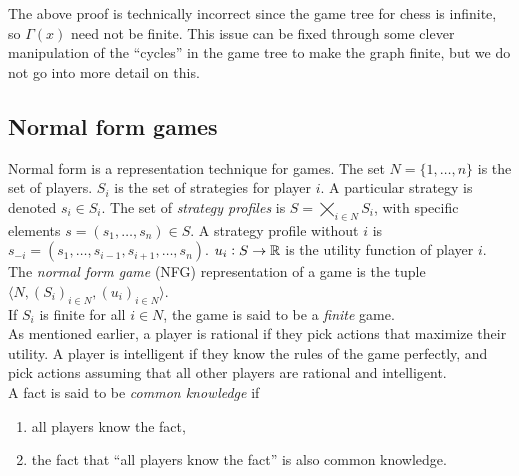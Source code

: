 	\begin{remark}
		The above proof is technically incorrect since the game tree for chess is infinite, so $\Gamma(x)$ need not be finite. This issue can be fixed through some clever manipulation of the ``cycles'' in the game tree to make the graph finite, but we do not go into more detail on this.
	\end{remark}

\subsection{Normal form games}

	Normal form is a representation technique for games. The set $N = \{1,\ldots,n\}$ is the set of players. $S_i$ is the set of strategies for player $i$. A particular strategy is denoted $s_i \in S_i$. The set of \emph{strategy profiles} is $S = \bigtimes_{i \in N} S_i$, with specific elements $s = (s_1,\ldots,s_n) \in S$. A strategy profile without $i$ is $s_{-i} = (s_1,\ldots,s_{i-1},s_{i+1},\ldots,s_n)$. $u_i : S \to \mathbb{R}$ is the utility function of player $i$.\\
	The \emph{normal form game} (NFG) representation of a game is the tuple $\langle N , (S_i)_{i \in N} , (u_i)_{i \in N} \rangle$.\\
	If $S_i$ is finite for all $i \in N$, the game is said to be a \emph{finite} game.\\

	As mentioned earlier, a player is rational if they pick actions that maximize their utility. A player is intelligent if they know the rules of the game perfectly, and pick actions assuming that all other players are rational and intelligent.\\

	A fact is said to be \emph{common knowledge} if
	\begin{enumerate}
		\item all players know the fact,
		\item the fact that ``all players know the fact'' is also common knowledge.
	\end{enumerate}

